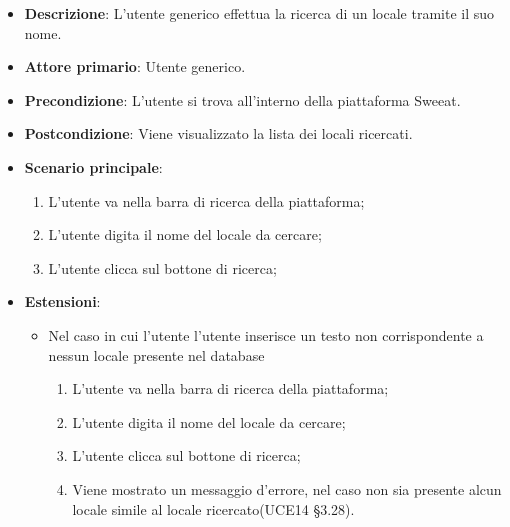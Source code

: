 \begin{itemize}
    \item \textbf{Descrizione}: L'utente generico effettua la ricerca di un locale tramite il suo nome.
    \item \textbf{Attore primario}: Utente generico.
    \item \textbf{Precondizione}: L'utente si trova all’interno della piattaforma Sweeat.
    \item \textbf{Postcondizione}: Viene visualizzato la lista dei locali ricercati.
    \item \textbf{Scenario principale}: 
    \begin{enumerate}
        \item L’utente va nella barra di ricerca della piattaforma;
        \item L’utente digita il nome del locale da cercare;
        \item L’utente clicca sul bottone di ricerca;
    \end{enumerate}
    \item \textbf{Estensioni}:
    \begin{itemize}
        \item Nel caso in cui l’utente l’utente inserisce un testo non corrispondente a nessun locale presente nel database
	\begin{enumerate}  
		\item L’utente va nella barra di ricerca della piattaforma;
        \item L’utente digita il nome del locale da cercare;
        \item L’utente clicca sul bottone di ricerca; 
        \item Viene mostrato un messaggio d'errore, nel caso non sia presente alcun locale simile al locale ricercato(UCE14 §3.28).
    \end{enumerate}
    \end{itemize}    
\end{itemize}

